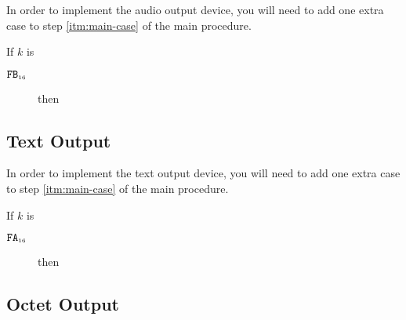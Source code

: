 \documentclass[a4paper,12pt]{article}
\newcommand{\num}[1]{\texttt{#1}}
\newcommand{\hex}[1]{\num{#1}_{\textup{\tiny 16}}}
\newcommand{\proc}[1]{\textsc{#1}}
\newcommand{\deviceio}[1]{$\langle$#1$\rangle$}
\newcommand{\op}[1]{$#1$}
\theoremstyle{definition}
\newcommand{\PUTCHAR}   [1]{\op{\hex{FA}}}
\newcommand{\ADDSAMPLE} [1]{\op{\hex{FB}}}
\begin{document}
In order to implement the audio output device, you will need to add one extra case to step \ref{itm:main-case} of the main procedure.

\begin{stepnumbers}[start=3]
\item If $k$ is
  \begin{description}
  \item[\ADDSAMPLE{}] then
  \end{description}
\end{stepnumbers}

\subsection{Text Output}

In order to implement the text output device, you will need to add one extra case to step \ref{itm:main-case} of the main procedure.

\begin{stepnumbers}[start=3]
  \setcounter{enumi}{2}
\item If $k$ is
  \begin{description}
  \item[\PUTCHAR{}] then
  \end{description}
\end{stepnumbers}

\subsection{Octet Output}
\end{document}
